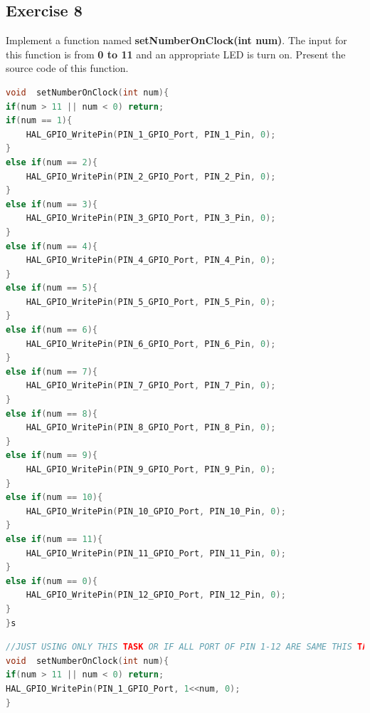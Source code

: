 \documentclass[twoside, final]{hcmut_report}
\begin{document}
\subsection{Exercise 8}
Implement a function named \textbf{setNumberOnClock(int num)}. The input for this function is from \textbf{0 to 11} and an appropriate LED is turn on. Present the source code of this function.
\begin{lstlisting}[language=C, caption=Source code for the setNumberOnClock(int num) function]
void  setNumberOnClock(int num){
if(num > 11 || num < 0) return;
if(num == 1){
	HAL_GPIO_WritePin(PIN_1_GPIO_Port, PIN_1_Pin, 0);
}
else if(num == 2){
	HAL_GPIO_WritePin(PIN_2_GPIO_Port, PIN_2_Pin, 0);
}
else if(num == 3){
	HAL_GPIO_WritePin(PIN_3_GPIO_Port, PIN_3_Pin, 0);
}
else if(num == 4){
	HAL_GPIO_WritePin(PIN_4_GPIO_Port, PIN_4_Pin, 0);
}
else if(num == 5){
	HAL_GPIO_WritePin(PIN_5_GPIO_Port, PIN_5_Pin, 0);
}
else if(num == 6){
	HAL_GPIO_WritePin(PIN_6_GPIO_Port, PIN_6_Pin, 0);
}
else if(num == 7){
	HAL_GPIO_WritePin(PIN_7_GPIO_Port, PIN_7_Pin, 0);
}
else if(num == 8){
	HAL_GPIO_WritePin(PIN_8_GPIO_Port, PIN_8_Pin, 0);
}
else if(num == 9){
	HAL_GPIO_WritePin(PIN_9_GPIO_Port, PIN_9_Pin, 0);
}
else if(num == 10){
	HAL_GPIO_WritePin(PIN_10_GPIO_Port, PIN_10_Pin, 0);
}
else if(num == 11){
	HAL_GPIO_WritePin(PIN_11_GPIO_Port, PIN_11_Pin, 0);
}
else if(num == 0){
	HAL_GPIO_WritePin(PIN_12_GPIO_Port, PIN_12_Pin, 0);
}
}s
\end{lstlisting}

\begin{lstlisting}[language=C, caption=Source code for the setNumberOnClock(int num) function]
//JUST USING ONLY THIS TASK OR IF ALL PORT OF PIN 1-12 ARE SAME THIS TASK.
void  setNumberOnClock(int num){
if(num > 11 || num < 0) return;
HAL_GPIO_WritePin(PIN_1_GPIO_Port, 1<<num, 0);
}
\end{lstlisting}
\end{document}
